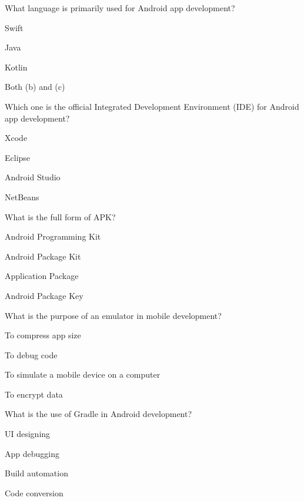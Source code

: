 \documentclass[11pt,a4paper]{article}
\begin{document}
\begin{parts}
  \item What language is primarily used for Android app development?
    
\begin{parts}
      \item Swift
      \item Java
      \item Kotlin
      \item Both (b) and (c)
    \end{parts}

  \item Which one is the official Integrated Development Environment (IDE) for Android app development?
    
\begin{parts}
      \item Xcode
      \item Eclipse
      \item Android Studio
      \item NetBeans
    \end{parts}

  \item What is the full form of APK?
    
\begin{parts}
      \item Android Programming Kit
      \item Android Package Kit
      \item Application Package
      \item Android Package Key
    \end{parts}

  \item What is the purpose of an emulator in mobile development?
    
\begin{parts}
      \item To compress app size
      \item To debug code
      \item To simulate a mobile device on a computer
      \item To encrypt data
    \end{parts}

  \item What is the use of Gradle in Android development?
    
\begin{parts}
      \item UI designing
      \item App debugging
      \item Build automation
      \item Code conversion
    \end{parts}
\end{parts}
\end{document}
